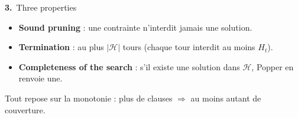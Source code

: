 \documentclass[10pt]{article}
\newcommand{\num}[1]{\textcolor{marine}{\textbf{#1.}}~}
\begin{document}
\begin{minipage}[t]{0.32\textwidth}
\begin{bloc}{\num{3}Three properties}
\begin{itemize}
  \item \textbf{Sound pruning} : une contrainte n'interdit jamais une solution.
  \item \textbf{Termination} : au plus $|\mathcal{H}|$ tours (chaque tour interdit au moins $H_t$).
  \item \textbf{Completeness of the search} : s'il existe une solution dans $\mathcal{H}$, Popper en renvoie une.
\end{itemize}
\begin{astuce}
Tout repose sur la monotonie : plus de clauses $\Rightarrow$ au moins autant de couverture.
\end{astuce}
\end{bloc}
\end{minipage}

\vspace{4pt}
\end{document}
